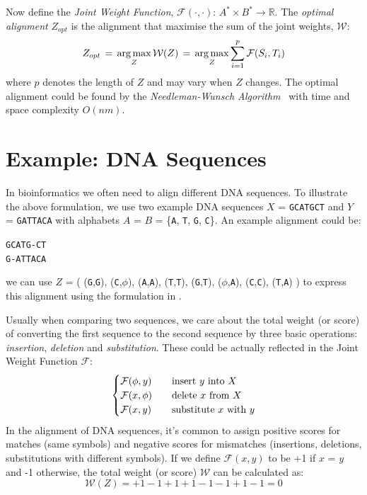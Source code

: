 Now define the \textit{Joint Weight Function}, $\mathcal{F}(\cdot,\cdot)$: $A^* \times B^* \to \mathbb{R}$. The \textit{optimal alignment} $Z_{opt}$ is the alignment that maximise the sum of the joint weights, $\mathcal{W}$:
\begin{equation}
  Z_{opt} \,=\, \operatorname*{arg\,max}_{Z} \mathcal{W}(Z) \,=\, \operatorname*{arg\,max}_{Z} \sum_{i=1}^{p} \mathcal{F}(S_i,T_i)
\end{equation}
where $p$ denotes the length of $Z$ and may vary when $Z$ changes. The optimal alignment could be found by the \textit{Needleman-Wunsch Algorithm}~\cite{needleman1970general} with time and space complexity $O(nm)$.

\section{Example: DNA Sequences}

In bioinformatics we often need to align different DNA sequences. To illustrate the above formulation, we use two example DNA sequences $X$ = \texttt{GCATGCT} and $Y$ = \texttt{GATTACA} with alphabets $A$ = $B$ = \{\texttt{A}, \texttt{T}, \texttt{G}, \texttt{C}\}. An example alignment could be:
\begin{center}
  \texttt{GCATG-CT}\\
  \texttt{G-ATTACA}
\end{center}
we can use $Z$ = (
  (\texttt{G},\texttt{G}),
  (\texttt{C},$\phi$),
  (\texttt{A},\texttt{A}),
  (\texttt{T},\texttt{T}),
  (\texttt{G},\texttt{T}),
  ($\phi$,\texttt{A}),
  (\texttt{C},\texttt{C}),
  (\texttt{T},\texttt{A})
) to express this alignment using the formulation in .

Usually when comparing two sequences, we care about the total weight (or score) of converting the first sequence to the second sequence by three basic operations: \textit{insertion}, \textit{deletion} and \textit{substitution}. These could be actually reflected in the Joint Weight Function $\mathcal{F}$:
\[
  \begin{cases}
    \mathcal{F}(\phi,y) & \text{\quad insert } y \text{ into } X \\
    \mathcal{F}(x,\phi) & \text{\quad delete } x \text{ from } X \\
    \mathcal{F}(x,y) & \text{\quad substitute } x \text{ with } y
  \end{cases}
\]
In the alignment of DNA sequences, it's common to assign positive scores for matches (same symbols) and negative scores for mismatches (insertions, deletions, substitutions with different symbols). If we define $\mathcal{F}(x,y)$ to be +1 if $x$ = $y$ and -1 otherwise, the total weight (or score) $\mathcal{W}$ can be calculated as:
\[ \mathcal{W}(Z) = + 1 - 1 + 1 + 1 - 1 - 1 + 1 - 1 = 0 \]

